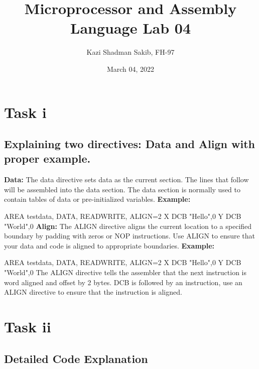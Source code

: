 \documentclass{article}
\title{Microprocessor and Assembly Language Lab 04}
\author{Kazi Shadman Sakib, FH-97}
\date{March 04, 2022}
\begin{document}
\maketitle

\section{Task i} 

\subsection{Explaining two directives: Data and Align with proper example.}

\textbf{Data:} The data directive sets data as the current section. The lines that follow will be assembled into the data section. The data section is normally used to contain tables of data or pre-initialized variables.\newline\newline
\textbf{Example:}

AREA test\textunderscore data, DATA, READWRITE, ALIGN=2\newline
X DCB "Hello",0\newline
Y DCB "World",0\newline\newline
\textbf{Align:} The ALIGN directive aligns the current location to a specified boundary by padding with zeros or NOP instructions. Use ALIGN to ensure that your data and code is aligned to appropriate boundaries.\newline\newline
\textbf{Example:}

AREA test\textunderscore data, DATA, READWRITE, ALIGN=2\newline
X DCB "Hello",0\newline
Y DCB "World",0\newline\newline
The ALIGN directive tells the assembler that the next instruction is word aligned and offset by 2 bytes. DCB is followed by an instruction, use an ALIGN directive to ensure that the instruction is aligned.

\section{Task ii}

\subsection{Detailed Code Explanation}
\end{document}
